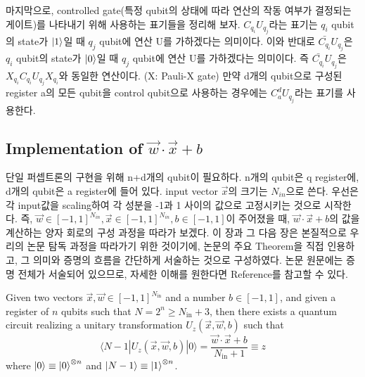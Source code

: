 마지막으로, controlled gate(특정 qubit의 상태에 따라 연산의 작동 여부가 결정되는 게이트)를 나타내기 위해 사용하는 표기들을 정리해 보자. \(C_{q_i}U_{q_j}\)라는 표기는 \(q_i\) qubit의 state가 \(\ket{1}\)일 때 \(q_j\) qubit에 연산 U를 가하겠다는 의미이다.
이와 반대로 \(\bar{C_{q_i}}U_{q_j}\)은 \(q_i\) qubit의 state가 \(\ket{0}\)일 때 \(q_j\) qubit에 연산 U를 가하겠다는 의미이다.
즉 \(\bar{C_{q_i}}U_{q_j}\)은 \(X_{q_i}C_{q_i}U_{q_j}X_{q_i}\)와 동일한 연산이다. (X: Pauli-X gate)
만약 d개의 qubit으로 구성된 register a의 모든 qubit을 control qubit으로 사용하는 경우에는 \(C_a^dU_{q_j}\)라는 표기를 사용한다.

\subsection{Implementation of \(\vec{w}\cdot\vec{x}+b\)}

단일 퍼셉트론의 구현을 위해 n+d개의 qubit이 필요하다. n개의 qubit은 q register에, d개의 qubit은 a register에 들어 있다. input vector \(\vec{x}\)의 크기는 \(N_{in}\)으로 쓴다.
우선은 각 input값을 scaling하여 각 성분을 -1과 1 사이의 값으로 고정시키는 것으로 시작한다.
즉, \(\vec{w} \in [-1,1]^{N_{in}}, \vec{x} \in [-1,1]^{N_{in}}, b \in [-1,1]\)이 주어졌을 때, \(\vec{w}\cdot\vec{x}+b\)의 값을 계산하는 양자 회로의 구성 과정을 따라가 보겠다.
이 장과 그 다음 장은 본질적으로 우리의 논문 탐독 과정을 따라가기 위한 것이기에, 논문의 주요 Theorem을 직접 인용하고, 그 의미와 증명의 흐름을 간단하게 서술하는 것으로 구성하였다. 논문 원문에는 증명 전체가 서술되어 있으므로,
자세한 이해를 원한다면 Reference를 참고할 수 있다.


\begin{lemma}

    Given two vectors $\vec{x}, \vec{w} \in [-1, 1]^{N_{\text{in}}}$ and a number $b \in [-1, 1]$, and given a register of $n$ qubits such that $N = 2^n \geq N_{\text{in}} + 3$, then there exists a quantum circuit realizing a unitary transformation $U_z(\vec{x}, \vec{w}, b)$ such that
\[
\langle N - 1 | U_z(\vec{x}, \vec{w}, b) | 0 \rangle = \frac{\vec{w} \cdot \vec{x} + b}{N_{\text{in}} + 1} \equiv z
\]
where $\ket{0} \equiv \ket{0}^{\otimes n}$ and $\ket{N-1} \equiv \ket{1}^{\otimes n}$.

\end{lemma}

